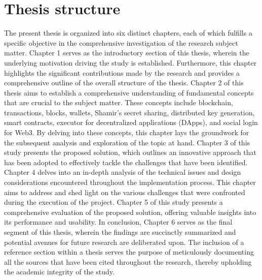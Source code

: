 \documentclass[../Main.tex]{subfiles}
\begin{document}
\section{Thesis structure}
\label{section:1.3}
The present thesis is organized into six distinct chapters, each of which fulfills a specific objective in the comprehensive investigation of the research subject matter. Chapter 1 serves as the introductory section of this thesis, wherein the underlying motivation driving the study is established. Furthermore, this chapter highlights the significant contributions made by the research and provides a comprehensive outline of the overall structure of the thesis. Chapter 2 of this thesis aims to establish a comprehensive understanding of fundamental concepts that are crucial to the subject matter. These concepts include blockchain, transactions, blocks, wallets, Shamir's secret sharing, distributed key generation, smart contracts, executor for decentralized applications (DApps), and social login for Web3. By delving into these concepts, this chapter lays the groundwork for the subsequent analysis and exploration of the topic at hand. Chapter 3 of this study presents the proposed solution, which outlines an innovative approach that has been adopted to effectively tackle the challenges that have been identified. Chapter 4 delves into an in-depth analysis of the technical issues and design considerations encountered throughout the implementation process. This chapter aims to address and shed light on the various challenges that were confronted during the execution of the project. Chapter 5 of this study presents a comprehensive evaluation of the proposed solution, offering valuable insights into its performance and usability. In conclusion, Chapter 6 serves as the final segment of this thesis, wherein the findings are succinctly summarized and potential avenues for future research are deliberated upon. The inclusion of a reference section within a thesis serves the purpose of meticulously documenting all the sources that have been cited throughout the research, thereby upholding the academic integrity of the study.
\end{document}
